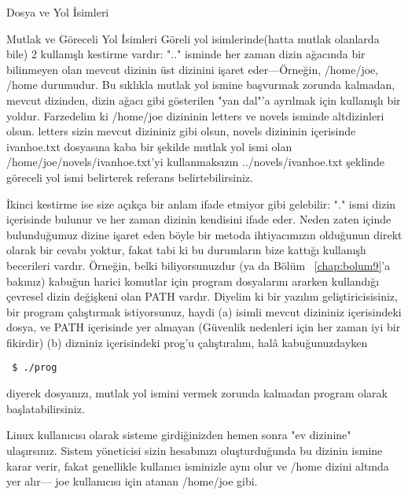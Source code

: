 \begin{section}{Dosya ve Yol İsimleri}
\begin{subsection}{Mutlak ve Göreceli Yol İsimleri}
Göreli yol isimlerinde(hatta mutlak olanlarda bile) 2 kullanışlı kestirme vardır: ".." isminde her zaman dizin ağacında bir bilinmeyen olan mevcut dizinin üst dizinini işaret eder—Örneğin, /home/joe, /home durumudur. Bu sıklıkla mutlak yol ismine başvurmak zorunda kalmadan, mevcut dizinden, dizin ağacı gibi gösterilen "yan dal"'a ayrılmak için kullanışlı bir yoldur. Farzedelim ki /home/joe dizininin letters ve novels isminde altdizinleri olsun. letters sizin mevcut dizininiz gibi olsun, novels dizininin içerisinde ivanhoe.txt dosyasına kaba bir şekilde mutlak yol ismi olan /home/joe/novels/ivanhoe.txt'yi kullanmaksızın ../novels/ivanhoe.txt şeklinde göreceli yol ismi belirterek referans belirtebilirsiniz.
	
İkinci kestirme ise size açıkça bir anlam ifade etmiyor gibi gelebilir: "." ismi dizin içerisinde bulunur ve her zaman dizinin kendisini ifade eder. Neden zaten içinde bulunduğumuz dizine işaret eden böyle bir metoda ihtiyacımızın olduğunun direkt olarak bir cevabı yoktur, fakat  tabi ki bu durumların bize kattığı kullanışlı becerileri vardır. Örneğin, belki biliyorsunuzdur (ya da Bölüm ~\ref{chap:bolum9}'a bakınız) kabuğun harici komutlar için program dosyalarını ararken kullandığı çevresel dizin değişkeni olan PATH vardır. Diyelim ki bir yazılım geliştiricisisiniz, bir program çalıştırmak istiyorsunuz, haydi (a) isimli mevcut dizininiz içerisindeki dosya, ve PATH içerisinde yer almayan (Güvenlik nedenleri için her zaman iyi bir fikirdir) (b) dizniniz içerisindeki prog'u çalıştıralım, halâ kabuğunuzdayken
\begin{verbatim}
 $ ./prog
\end{verbatim} 
diyerek dosyanızı, mutlak yol ismini vermek zorunda kalmadan program olarak başlatabilirsiniz.

Linux kullanıcısı olarak sisteme girdiğinizden hemen sonra "ev dizinine" ulaşırsınız. Sistem yöneticisi sizin hesabınızı oluşturduğunda bu dizinin ismine karar verir, fakat genellikle kullanıcı isminizle aynı olur ve /home dizini altında yer alır— joe kullanıcısı için atanan /home/joe gibi.

\end{subsection}
\end{section}

